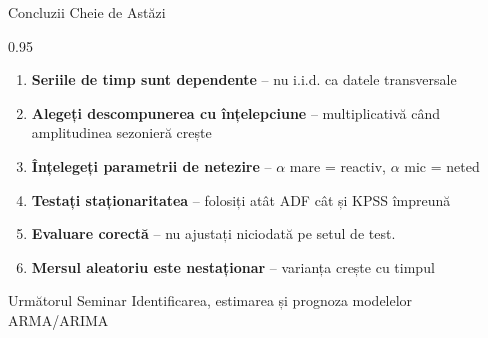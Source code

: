 \documentclass[9pt, aspectratio=169, t]{beamer}
\begin{document}
\begin{frame}{Concluzii Cheie de Astăzi}
    \begin{cminipage}{0.95\textwidth}
    \begin{enumerate}\setlength{\itemsep}{0pt}
        \item \textbf{Seriile de timp sunt dependente} -- nu i.i.d. ca datele transversale

        \vspace{0.15cm}

        \item \textbf{Alegeți descompunerea cu înțelepciune} -- multiplicativă când amplitudinea sezonieră crește

        \vspace{0.15cm}

        \item \textbf{Înțelegeți parametrii de netezire} -- $\alpha$ mare = reactiv, $\alpha$ mic = neted

        \vspace{0.15cm}

        \item \textbf{Testați staționaritatea} -- folosiți atât ADF cât și KPSS împreună

        \vspace{0.15cm}

        \item \textbf{Evaluare corectă} -- nu ajustați niciodată pe setul de test.

        \vspace{0.15cm}

        \item \textbf{Mersul aleatoriu este nestaționar} -- varianța crește cu timpul
    \end{enumerate}

    \vspace{0.3cm}

    \begin{block}{Următorul Seminar}
        Identificarea, estimarea și prognoza modelelor ARMA/ARIMA
    \end{block}
    \end{cminipage}
\end{frame}
\end{document}
